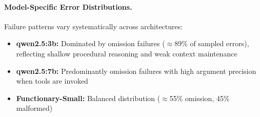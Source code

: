 \documentclass[conference]{IEEEtran}
\begin{document}
\paragraph{Model-Specific Error Distributions.}
Failure patterns vary systematically across architectures:

\begin{itemize}
    \item \textbf{qwen2.5:3b:} Dominated by omission failures ($\approx$89\% of sampled errors), reflecting shallow procedural reasoning and weak context maintenance
    
    \item \textbf{qwen2.5:7b:} Predominantly omission failures with high argument precision when tools are invoked%
    
    \item \textbf{Functionary-Small:} 
    Balanced distribution ($\approx$55\% omission, 45\% malformed)
\end{itemize}


    
    
    
    
\end{document}
